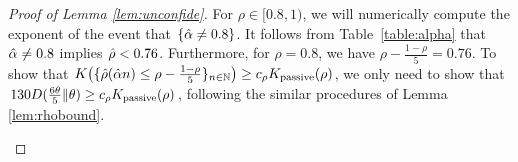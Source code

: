 \begin{proof}[Proof of Lemma \ref{lem:unconfide}]
	For $\rho\in [0.8,1)$, we will numerically compute the exponent of the event that $\{\hat{\alpha} \neq 0.8\}$. It follows from Table~\ref{table:alpha} that $\hat{\alpha} \neq 0.8$ implies $\hat{\rho}<0.76$. Furthermore, for $\rho=0.8$, we have $\rho-\frac{1-\rho}{5}=0.76$. To show that $K\big(\{\hat{\rho}(\hat{\alpha} n)\leq \rho-\frac{1-\rho}{5}\}_{n\in\mathbb{N}}\big)\geq c_{\rho}K_{{\rm passive}}(\rho)$, we only need to show that $130D(\frac{6\theta}{5}\|\theta)\geq c_{\rho}K_{{\rm passive}}(\rho)$, following the similar procedures of Lemma \ref{lem:rhobound}.
	\begin{figure}[t] 
		\centering
		\hspace{.15in}
\end{figure}
\end{proof}
